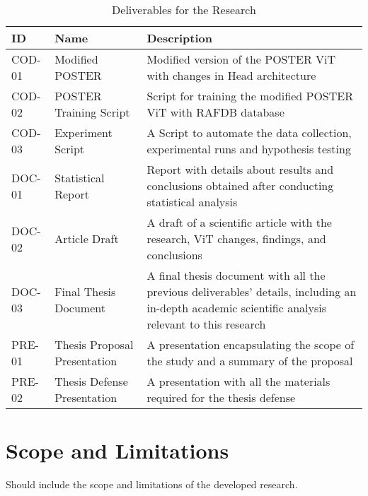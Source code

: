 \renewcommand{\arraystretch}{2.5}
\begin{table}[H]
\label{tb:table_deliverable}
\caption{Deliverables for the Research}
\begin{tabular}{@{}llp{10cm}@{}}
\toprule
\textbf{ID} & \textbf{Name} & \textbf{Description} \\ \midrule
COD-01 & Modified POSTER & 
\parbox[t]{10cm}{Modified version of the POSTER ViT with changes in Head architecture} \\
COD-02 & POSTER Training Script & 
\parbox[t]{10cm}{Script for training the modified POSTER ViT with RAFDB database} \\
COD-03 & Experiment Script & 
\parbox[t]{10cm}{A Script to automate the data collection, experimental runs and hypothesis testing
} \\
DOC-01 & Statistical Report & 
\parbox[t]{10cm}{Report with details about results and conclusions obtained after conducting statistical analysis} \\
DOC-02 & Article Draft & 
\parbox[t]{10cm}{A draft of a scientific article with the research, ViT changes, findings, and conclusions} \\
DOC-03 & Final Thesis Document & 
\parbox[t]{10cm}{A final thesis document with all the previous deliverables' details, including an in-depth academic scientific analysis relevant to this research} \\
PRE-01 & Thesis Proposal Presentation & 
\parbox[t]{10cm}{A presentation encapsulating the scope of the study and a summary of the proposal} \\
PRE-02 & Thesis Defense Presentation & 
\parbox[t]{10cm}{A presentation with all the materials required for the thesis defense} \\ 
\bottomrule
\end{tabular}
\end{table}





\section{Scope and Limitations}

Should include the scope and limitations of the developed research.

